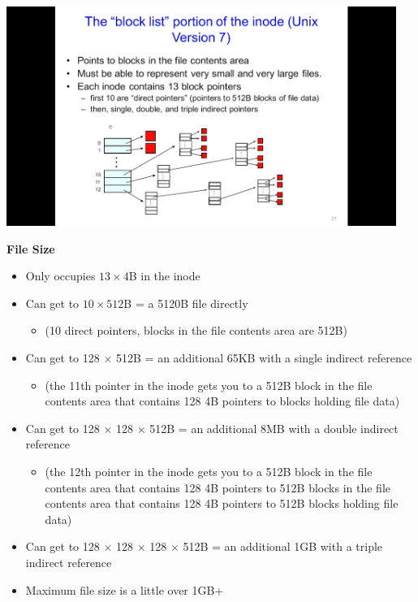 \documentclass[11pt,a4paper]{article}
\begin{document}
\includegraphics[height=270]{the-block-list-portion-of-the-inode.jpg}

\textbf{File Size}
\begin{itemize}
    \item Only occupies $13 \times 4$B in the inode
    \item Can get to $10 \times 512$B = a 5120B file directly
        \begin{itemize}
            \item (10 direct pointers, blocks in the file contents area are 512B)
        \end{itemize}
    \item Can get to 128 $\times$ 512B = an additional 65KB with a single indirect reference
        \begin{itemize}
            \item (the 11th pointer in the inode gets you to a 512B block in the file
                contents area that contains 128 4B pointers to blocks holding file data)
        \end{itemize}
    \item Can get to 128 $\times$ 128 $\times$ 512B = an additional 8MB with a double
        indirect reference
        \begin{itemize}
            \item (the 12th pointer in the inode gets you to a 512B block in the file contents
                area that contains 128 4B pointers to 512B blocks in the file contents area
                that contains 128 4B pointers to 512B blocks holding file data)
        \end{itemize}
    \item Can get to 128 $\times$ 128 $\times$ 128 $\times$ 512B = an additional 1GB with a
        triple indirect reference
    \item Maximum file size is a little over 1GB+
\end{itemize}
\end{document}
